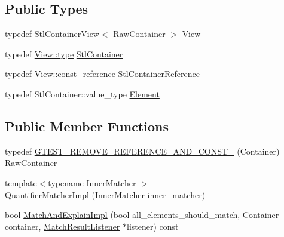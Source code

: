 \subsection*{Public Types}
\begin{DoxyCompactItemize}
\item 
typedef \hyperlink{classtesting_1_1internal_1_1StlContainerView}{Stl\+Container\+View}$<$ Raw\+Container $>$ \hyperlink{classtesting_1_1internal_1_1QuantifierMatcherImpl_aa1e6b1653b6fdee1b0cfc4c58a9059e6}{View}
\item 
typedef \hyperlink{classtesting_1_1internal_1_1StlContainerView_a2b2c63a6dcdbfe63fb0ee121ebf463ba}{View\+::type} \hyperlink{classtesting_1_1internal_1_1QuantifierMatcherImpl_a7faa9a49c627e6db66e0ff9cdc88b6fc}{Stl\+Container}
\item 
typedef \hyperlink{classtesting_1_1internal_1_1StlContainerView_a9cd4f6ed689b3938cdb7b3c4cbf1b36b}{View\+::const\+\_\+reference} \hyperlink{classtesting_1_1internal_1_1QuantifierMatcherImpl_a341dd7815b3c6090d935026daac6e938}{Stl\+Container\+Reference}
\item 
typedef Stl\+Container\+::value\+\_\+type \hyperlink{classtesting_1_1internal_1_1QuantifierMatcherImpl_a6f73e2e5fa853f8b5fdd33d6a1811f9e}{Element}
\end{DoxyCompactItemize}
\subsection*{Public Member Functions}
\begin{DoxyCompactItemize}
\item 
typedef \hyperlink{classtesting_1_1internal_1_1QuantifierMatcherImpl_aa3648a9fce92090dc3987eb10faf16e1}{G\+T\+E\+S\+T\+\_\+\+R\+E\+M\+O\+V\+E\+\_\+\+R\+E\+F\+E\+R\+E\+N\+C\+E\+\_\+\+A\+N\+D\+\_\+\+C\+O\+N\+S\+T\+\_\+} (Container) Raw\+Container
\item 
{\footnotesize template$<$typename Inner\+Matcher $>$ }\\\hyperlink{classtesting_1_1internal_1_1QuantifierMatcherImpl_aef125c9971ea1d02d138cd8fd2af0287}{Quantifier\+Matcher\+Impl} (Inner\+Matcher inner\+\_\+matcher)
\item 
bool \hyperlink{classtesting_1_1internal_1_1QuantifierMatcherImpl_a01384d42781094ddc5d9208b63f23b3d}{Match\+And\+Explain\+Impl} (bool all\+\_\+elements\+\_\+should\+\_\+match, Container container, \hyperlink{classtesting_1_1MatchResultListener}{Match\+Result\+Listener} $\ast$listener) const 
\end{DoxyCompactItemize}
